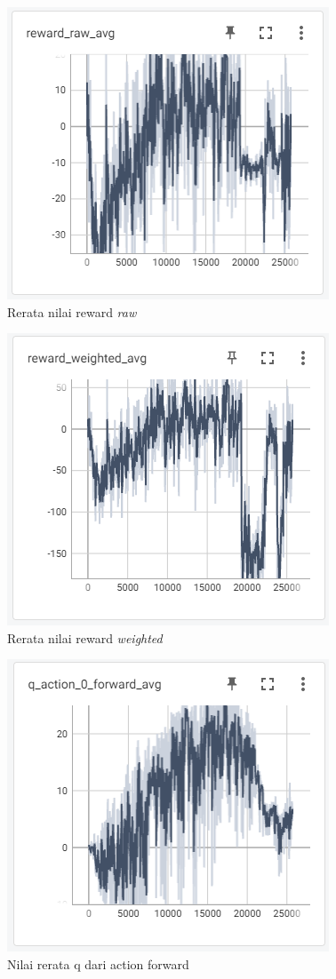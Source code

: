 \begin{figure}[H] 
	\centering
	\includegraphics[width=.7\linewidth]{images/reward_raw_avg}
	\caption{Rerata nilai reward \textit{raw}}
	\label{fig:reward_raw_avg}
\end{figure}
\begin{figure}[H] 
	\centering
	\includegraphics[width=.7\linewidth]{images/reward_weighted_avg}
	\caption{Rerata nilai reward \textit{weighted}}
	\label{fig:reward_weighted_avg}
\end{figure}
\begin{figure}[H] 
	\centering
	\includegraphics[width=.7\linewidth]{images/q_action_0_forward_avg}
	\caption{Nilai rerata q dari action forward}
	\label{fig:q_action_0_forward_avg}
\end{figure}
